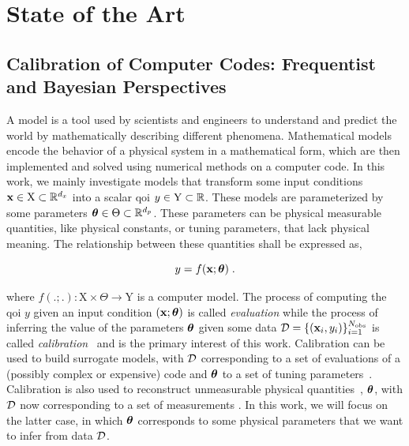 %
\chapter{State of the Art}
\label{sec:sota_1}



\section{Calibration of Computer Codes: Frequentist and Bayesian Perspectives}
\label{sec:sota_1:bayesian_calibration}


A model is a tool used by scientists and engineers to understand and predict the world by mathematically describing different phenomena. Mathematical models encode the behavior of a physical system in a mathematical form, which are then implemented and solved using numerical methods on a computer code. In this work, we mainly investigate models that transform some input conditions $\mathbf{x} \in \mathrm{X} \subset \mathbb{R}^{d_x}$ into a scalar \gls{qoi} $y \in \mathrm{Y} \subset \mathbb{R}$. These models are parameterized by some parameters $\boldsymbol{\theta} \in \Theta \subset \mathbb{R}^{d_p}$. These parameters can be physical measurable quantities, like physical constants, or tuning parameters, that lack physical meaning. The relationship between these quantities shall be expressed as,

\begin{equation}
    y = f(\mathbf{x}; \boldsymbol{\theta})\;.
    \label{eq:sota_1:y}
\end{equation}

where $f(.;.) : \mathrm{X} \times \Theta \rightarrow \mathrm{Y}$ is a computer model. The process of computing the \gls{qoi} $y$ given an input condition $(\mathbf{x};\boldsymbol{\theta})$ is called \textit{evaluation} while the process of inferring the value of the parameters $\boldsymbol{\theta}$ given some data $\mathcal{D} = \{(\mathbf{x}_i,y_i)\}_{i=1}^{N_{\mathrm{obs}}}$ is called \textit{calibration}~\cite{uq_theory} and is the primary interest of this work. Calibration can be used to build surrogate models, with $\mathcal{D}$ corresponding to a set of evaluations of a (possibly complex or expensive) code and $\boldsymbol{\theta}$ to a set of tuning parameters~\cite{Banks1989}. Calibration is also used to reconstruct unmeasurable physical quantities~\cite{params_cali}, $\boldsymbol{\theta}$, with $\mathcal{D}$ now corresponding to a set of measurements . In this work, we will focus on the latter case, in which $\boldsymbol{\theta}$ corresponds to some physical parameters that we want to infer from data $\mathcal{D}$.

